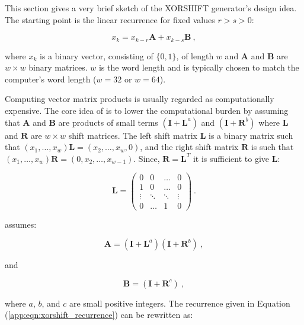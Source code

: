 \documentclass[a4paper]{scrartcl}
\begin{document}
This section gives a very brief sketch of the XORSHIFT generator's design idea. The starting point is the linear recurrence for fixed values $r > s > 0$:

\begin{equation}
x_{k} = x_{k - r} \mathbf{A} + x_{k - s} \mathbf{B}
\label{app:eqn:xorshift_recurrence}
~,\end{equation}

where $x_k$ is a binary vector, consisting of $\{ 0, 1\}$, of length $w$ and $\mathbf{A}$ and $\mathbf{B}$ are $w \times w$ binary matrices. $w$ is the word length and is typically chosen to match the computer's word length ($w = 32$ or $w = 64$).

Computing vector matrix products is usually regarded as computationally expensive. The core idea of \citet{Marsaglia2003} is to lower the computational burden by assuming that $\mathbf{A} $ and $\mathbf{B}$ are products of small terms $(\mathbf{I} + \mathbf{L}^a)$ and $(\mathbf{I} + \mathbf{R}^b)$ where $\mathbf{L}$ and $\mathbf{R}$ are $w \times w$ shift matrices. The left shift matrix $\mathbf{L}$ is a binary matrix such that $(x_1, \dots, x_w) \mathbf{L} = (x_2, \dots, x_w, 0)$, and the right shift matrix $\mathbf{R}$ is such that $(x_1, \dots, x_w) \mathbf{R} = (0, x_2, \dots, x_{w-1})$. Since, $\mathbf{R} = \mathbf{L}^T$ it is sufficient to give $\mathbf{L}$:

\begin{equation*}
\mathbf{L} = \left( \begin{array}{cccc}
0 & 0 & \dots & 0 \\
1 & 0 & \dots & 0 \\
\vdots & \ddots & \ddots & \vdots \\
0 & \dots & 1 & 0\end{array} \right)~.
\end{equation*} 

\citet{Marsaglia2003} assumes:

\begin{equation*}
\mathbf{A} = (\mathbf{I} + \mathbf{L}^a)(\mathbf{I} + \mathbf{R}^b)~,
\end{equation*}

and

\begin{equation*}
\mathbf{B} = (\mathbf{I} + \mathbf{R}^c)~,
\end{equation*}

where $a$, $b$, and $c$ are small positive integers. The recurrence given in Equation (\ref{app:eqn:xorshift_recurrence}) can be rewritten as:
\end{document}
